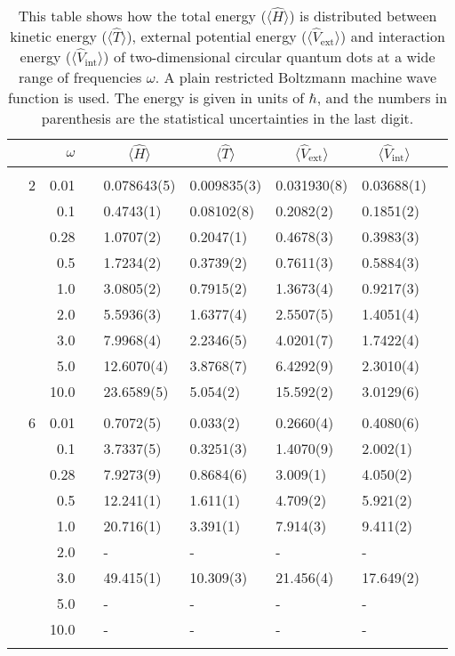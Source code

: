 \begin{table}[H]
	\caption{This table shows how the total energy ($\langle\hat{H}\rangle$) is distributed between kinetic energy ($\langle\hat{T}\rangle$), external potential energy ($\langle\hat{V}_{\text{ext}}\rangle$) and interaction energy ($\langle\hat{V}_{\text{int}}\rangle$) of two-dimensional circular quantum dots at a wide range of frequencies $\omega$. A plain restricted Boltzmann machine wave function is used. The energy is given in units of $\hbar$, and the numbers in parenthesis are the statistical uncertainties in the last digit.}
	\label{tab:splitfrequencyQDRBM}
	\begin{tabularx}{\textwidth}{R{1cm}rrcR{2.3cm}R{2.3cm}R{2.3cm}R{2.3cm}R{1cm}} \hline\hline
		&\makecell{\\ \phantom{$N$} \\ \phantom{=}} & $\omega$ &&  &  &  &  & \\ \hline \\
		&2 & 0.01 && 0.078643(5) & 0.009835(3) & 0.031930(8) & 0.03688(1) \\
		&& 0.1 && 0.4743(1) & 0.08102(8) & 0.2082(2) & 0.1851(2) \\
		&& 0.28 && 1.0707(2) & 0.2047(1) & 0.4678(3) & 0.3983(3) \\
		&& 0.5 && 1.7234(2) & 0.3739(2) & 0.7611(3) & 0.5884(3)\\
		&& 1.0 && 3.0805(2) & 0.7915(2) & 1.3673(4) & 0.9217(3)\\
		&& 2.0 && 5.5936(3) & 1.6377(4) & 2.5507(5) & 1.4051(4) \\
		&& 3.0 && 7.9968(4) & 2.2346(5) & 4.0201(7) & 1.7422(4) \\ 
		&& 5.0 && 12.6070(4) & 3.8768(7) & 6.4292(9) & 2.3010(4) \\
		&& 10.0 && 23.6589(5) & 5.054(2) & 15.592(2) & 3.0129(6) \\
		\hdashline \\
		
		&6 & 0.01 && 0.7072(5) & 0.033(2) & 0.2660(4) & 0.4080(6) \\
		&& 0.1 && 3.7337(5) & 0.3251(3) & 1.4070(9) & 2.002(1) \\
		&& 0.28 && 7.9273(9) & 0.8684(6) & 3.009(1) & 4.050(2) \\
		&& 0.5 && 12.241(1) & 1.611(1) & 4.709(2) & 5.921(2)\\
		&& 1.0 && 20.716(1) & 3.391(1) & 7.914(3) & 9.411(2)\\
		&& 2.0 && - & - & - & -\\
		&& 3.0 && 49.415(1) & 10.309(3) & 21.456(4) & 17.649(2) \\ 
		&& 5.0 && - & - & - & -\\
		&& 10.0 && - & - & - & -\\
		\hdashline \\
		

\end{tabularx}
\end{table}
